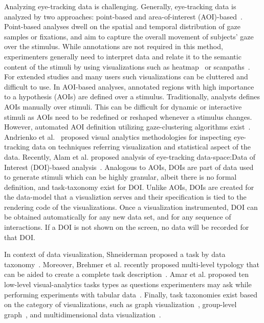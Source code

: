 Analyzing eye-tracking data is challenging. Generally, eye-tracking data is analyzed by two approaches: point-based and area-of-interest (AOI)-based~\cite{blascheck2014state}. Point-based analyses dwell on the spatial and temporal distribution of gaze samples or fixations, and aim to capture the overall movement of subjects' gaze over the stimulus.  While  annotations are not required in this method, experimenters generally need to interpret data and relate it to the semantic content of the stimuli by using visualizations such as heatmap~\cite{mackworth1958eye} or scanpaths~\cite{noton1971scanpathsA, noton1971scanpathsB}. For extended studies and many users such visualizations can be cluttered and difficult to use. In AOI-based analyses, annotated regions with high importance to a hypothesis (AOIs) are defined over a stimulus. Traditionally, analysts defines AOIs manually over stimuli. This can be difficult for dynamic or interactive stimuli as AOIs need to be redefined or reshaped whenever a stimulus changes. However, automated AOI definition utilizing gaze-clustering algorithms exist~\cite{privitera2000algorithms}. Andrienko et al.~\cite{andrienko2012visual} proposed visual analytics methodologies for inspecting eye-tracking data on techniques referring visualization and statistical aspect of the data. Recently, Alam et al. proposed analysis of eye-tracking data-space:Data of Interest (DOI)-based analysis~\cite{alamdata}. Analogous to AOIs, DOIs are part of data used to generate stimuli which can be highly granular, albeit there is no formal definition, and task-taxonomy exist for DOI. Unlike AOIs, DOIs are created for the data-model that a visualiztion serves and their specification is tied to the rendering code of the visualizations. Once a visualization instrumented, DOI can be obtained automatically for any new data set, and for any sequence of interactions. If a DOI is not shown on the screen, no data will be recorded for that DOI.

 In context of data visualization, Shneiderman proposed a task by data taxonomy~\cite{shneiderman1996eyes}. Moreover, Brehmer et al. recently proposed multi-level typology that can be aided to create a complete task description~\cite{brehmer2013multi}. Amar et al. proposed ten low-level visual-analytics tasks types as questions experimenters may ask while performing experiments with tabular data~\cite{amar2005low}. Finally, task taxonomies exist based on the category of visualizations, such as graph visualization~\cite{lee2006task}, group-level graph~\cite{saket2014group}, and multidimensional data visualization~\cite{ward2002taxonomy}. 

